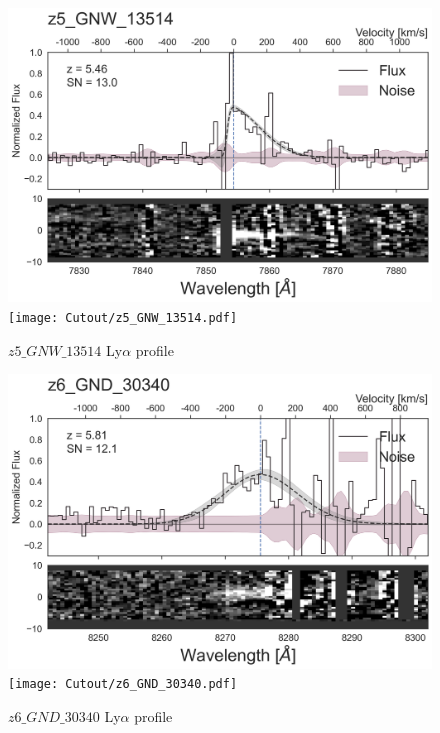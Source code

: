 \documentclass[12pt,english]{article}
\begin{document}
\clearpage
\begin{figure}
\begin{center}\includegraphics[width=12cm, trim=0.1cm 0cm 0cm -1cm]{LyaProfiles/z5_GNW_13514.png}
\texttt{[image: Cutout/z5\_GNW\_13514.pdf]}
\caption{$z5\_GNW\_13514$ Ly$\alpha$ profile}
\end{center}
\end{figure}
\clearpage
\begin{figure}
\begin{center}\includegraphics[width=12cm, trim=0.1cm 0cm 0cm -1cm]{LyaProfiles/z6_GND_30340.png}
\texttt{[image: Cutout/z6\_GND\_30340.pdf]}
\caption{$z6\_GND\_30340$ Ly$\alpha$ profile}
\end{center}
\end{figure}
\clearpage
\end{document}
